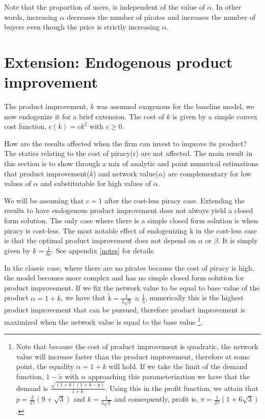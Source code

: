 Note that the proportion of users, is independent of the value of $\alpha$. In other words, increasing $\alpha$ decreases the number of pirates and increases the number of buyers even though the price is strictly increasing $\alpha$. 


\section{Extension: Endogenous product improvement}

The product improvement, $k$ was assumed exogenous for the baseline model, we now endogenize it for a brief extension. The cost of $k$ is given by a simple convex cost function, $c(k)= ck^2$ with $c \geq 0$. 

How are the results affected when the firm can invest to improve its product? The statics relating to the cost of piracy(r) are not affected. The main result in this section is to show through a mix of analytic and point numerical estimations that product improvement($k$) and network value($\alpha$) are complementary for low values of $\alpha$ and substitutable for high values of $\alpha$.

We will be assuming that $c=1$ after the cost-less piracy case. Extending the results to have endogenous product improvement does not always yield a closed form solution. The only case where there is a simple closed form solution is when piracy is cost-less. The most notable effect of endogenizing k in the cost-less case is that the optimal product improvement does not depend on $\alpha$ or $\beta$. It is simply given by $k=\frac{1}{8c}$. See appendix \ref{notes} for details.

In the classic case, where there are no pirates because the cost of piracy is high, the model becomes more complex and has no simple closed form solution for product improvement. If we fix the network value to be equal to base value of the product $\alpha=1+k$, we have that $\tilde{k} = \frac{1}{3 \sqrt{3}} \approx \frac{1}{5}$, numerically this is the highest product improvement that can be pursued, therefore product improvement is maximized when the network value is equal to the base value \footnote{Note that because the cost of product improvement is quadratic, the network value will increase faster than the product improvement, therefore at some point, the equality $\alpha = 1+k$ will hold. If we take the limit of the demand function, $1-\tilde{x}$ with $\alpha$ approaching this parameterization we have that the demand is $\frac{\sqrt{(1+k)(1+k-p)}}{1+k}$. Using this in the profit function, we attain that $p=\frac{2}{27} (9 + \sqrt{3})$ and $k=\frac{1}{3 \sqrt{3}} $ and consequently, profit is, $\pi = \frac{1}{27} \left(1+6 \sqrt{3}\right)$.}.

